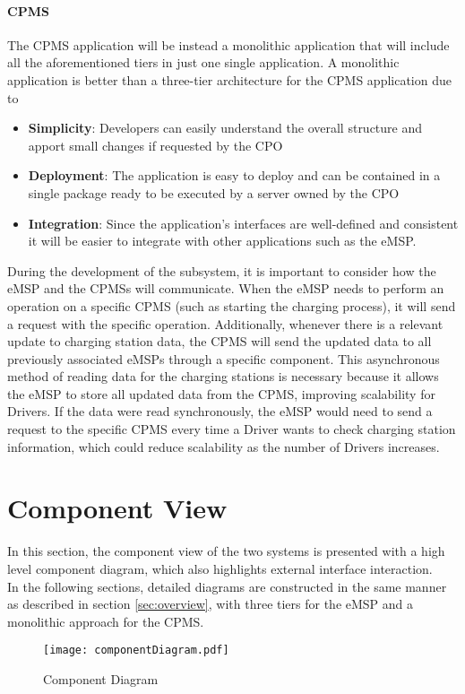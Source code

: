 \paragraph{CPMS}
The CPMS application will be instead a monolithic application that will include all the aforementioned tiers in just one single application. A monolithic application is better than a three-tier architecture for the CPMS application due to
\begin{itemize}
    \item \textbf{Simplicity}: Developers can easily understand the overall structure and apport small changes if requested by the CPO
    \item \textbf{Deployment}: The application is easy to deploy and can be contained in a single package ready to be executed by a server owned by the CPO
    \item \textbf{Integration}: Since the application's interfaces are well-defined and consistent it will be easier to integrate with other applications such as the eMSP.
\end{itemize}
During the development of the subsystem, it is important to consider how the eMSP and the CPMSs will communicate. When the eMSP needs to perform an operation on a specific CPMS (such as starting the charging process), it will send a request with the specific operation. Additionally, whenever there is a relevant update to charging station data, the CPMS will send the updated data to all previously associated eMSPs through a specific component. This asynchronous method of reading data for the charging stations is necessary because it allows the eMSP to store all updated data from the CPMS, improving scalability for Drivers. If the data were read synchronously, the eMSP would need to send a request to the specific CPMS every time a Driver wants to check charging station information, which could reduce scalability as the number of Drivers increases.
\section{Component View} %
\label{sec:componentView}
In this section, the component view of the two systems is presented with a high level component diagram, which also highlights external interface interaction. \\%
In the following sections, detailed diagrams are constructed in the same manner as described in section \ref{sec:overview}, with three tiers for the eMSP and a monolithic approach for the CPMS.
\begin{figure}[H]
            \begin{center}
            \texttt{[image: componentDiagram.pdf]}
            \caption{Component Diagram}
            \label{fig:ComponentDiagram}
            \end{center}
        \end{figure}
\restoregeometry        
